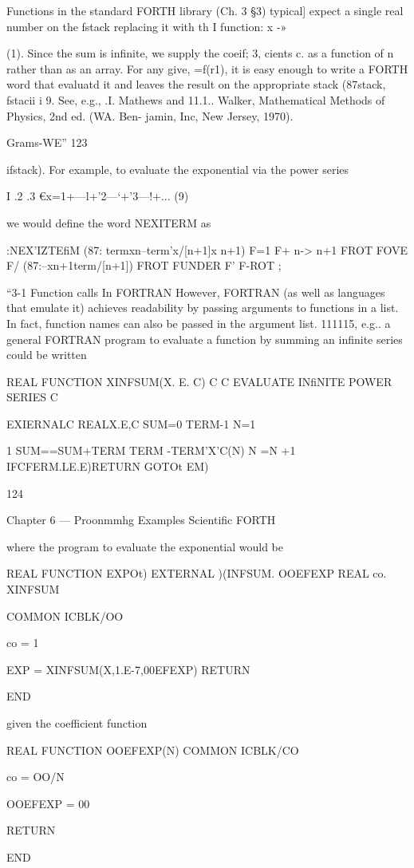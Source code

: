 Functions in the standard FORTH library (Ch. 3 §3) typical]
expect a single real number on the fstack replacing it with th I
function: x -» {(1). Since the sum is infinite, we supply the coeif; 3,
cients c. as a function of n rather than as an array. For any give,
=f(r1), it is easy enough to write a FORTH word that evaluatd
it and leaves the result on the appropriate stack (87stack, fstacii
i
9. See, e.g., .I. Mathews and 11.1.. Walker, Mathematical Methods of Physics, 2nd ed. (WA. Ben-
jamin, Inc, New Jersey, 1970).

Grams-WE” 123

ifstack). For example, to evaluate the exponential via the power
series

I .2 .3
€x=1+—l+'2—‘+'3—!+... (9)

we would define the word NEXITERM as

:NEX'IZTEfiM (87: termxn--term'x/[n+1]x n+1)
F=1 F+ n-> n+1
FROT FOVE F/ (87:--xn+1term/[n+1])
FROT FUNDER F' F-ROT ;

“3-1 Function calls In FORTRAN
However, FORTRAN (as well as languages that emulate it)
achieves readability by passing arguments to functions in a list. In
fact, function names can also be passed in the argument list. 111115,
e.g.. a general FORTRAN program to evaluate a function by
summing an infinite series could be written

REAL FUNCTION XINFSUM(X. E. C)
C
C EVALUATE INfiNITE POWER SERIES
C

EXIERNALC
REALX.E,C
SUM=0
TERM-1
N=1

1 SUM==SUM+TERM
TERM -TERM'X'C(N)
N =N +1
IFCFERM.LE.E)RETURN
GOTOt
EM)

124

Chapter 6 — Proonmmhg Examples Scientific FORTH

where the program to evaluate the exponential would be

REAL FUNCTION EXPOt)
EXTERNAL )(INFSUM. OOEFEXP
REAL co. XINFSUM

COMMON ICBLK/OO

co = 1

EXP = XINFSUM(X,1.E-7,00EFEXP)
RETURN

END

given the coefficient function

REAL FUNCTION OOEFEXP(N)
COMMON ICBLK/CO

co = OO/N

OOEFEXP = 00

RETURN

END

}
